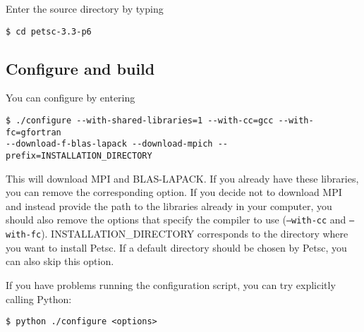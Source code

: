 \documentclass[a4paper]{article}
\begin{document}
Enter the source directory by typing
\begin{lstlisting}
$ cd petsc-3.3-p6
\end{lstlisting}

\subsection*{Configure and build}

You can configure by entering

\begin{lstlisting}
$ ./configure --with-shared-libraries=1 --with-cc=gcc --with-fc=gfortran
--download-f-blas-lapack --download-mpich --prefix=INSTALLATION_DIRECTORY
\end{lstlisting}

This will download MPI and BLAS-LAPACK. If you already have these libraries, you can remove the
corresponding option. If you decide not to download MPI and instead provide the path to the
libraries already in your computer, you should also remove the options that
specify the compiler to use (\texttt{--with-cc} and \texttt{--with-fc}).
\mbox{INSTALLATION\_DIRECTORY} corresponds to the directory where you want to install Petsc.
If a default directory should be chosen by Petsc, you can also skip this option.

If you have problems running the configuration script, you can try explicitly calling Python:

\begin{lstlisting}
$ python ./configure <options>
\end{lstlisting}




\end{document}
